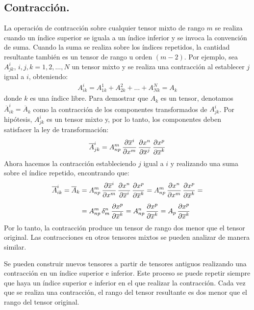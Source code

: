 \documentclass[hidelinks,12pt]{article}
\begin{document}
\subsection{Contracción.}

La operación de contracción sobre cualquier tensor mixto de rango $m$ se realiza cuando un índice superior se iguala a un índice inferior y se invoca la convención de suma. Cuando la suma se realiza sobre los índices repetidos, la cantidad resultante también es un tensor de rango u orden $(m - 2)$. Por ejemplo, sea $A_{jk}^{i}, \, i, j, k = 1, 2, \ldots, N$ un tensor mixto y se realiza una contracción al establecer $j$ igual a $i$, obteniendo:
\begin{align}
A_{ik}^{i} = A_{1k}^{1} + A_{2k}^{2} + \ldots + A_{Nk}^{N} = A_{k}
\label{eq:ecuacion_01_02_57}
\end{align}
donde $k$ es una índice libre. Para demostrar que $A_{k}$ es un tensor, denotamos $\overline{A}_{ik}^{i} = \overline{A}_{k}$ como la contracción de los componentes transformados de $A_{jk}^{i}$. Por hipótesis, $A_{jk}^{i}$ es un tensor mixto y, por lo tanto, los componentes deben satisfacer la ley de transformación:
\begin{align*}
\overline{A}_{jk}^{i} = A_{np}^{m} \, \pdv{\overline{x}^{i}}{x^{m}} \, \pdv{x^{n}}{\overline{x}^{j}} \, \pdv{x^{p}}{\overline{x}^{k}}
\end{align*}
Ahora hacemos la contracción estableciendo $j$ igual a $i$ y realizando una suma sobre el índice repetido, encontrando que:
\begin{align}
\begin{aligned}
\overline{A}_{ik}^{i} = \overline{A}_{k} &= A_{np}^{m} \, \pdv{\overline{x}^{i}}{x^{m}} \, \pdv{x^{n}}{\overline{x}^{i}} \, \pdv{x^{p}}{\overline{x}^{k}} = A_{np}^{m} \, \pdv{x^{n}}{x^{m}} \, \pdv{x^{p}}{\overline{x}^{k}} = \\[0.5em]
&= A_{np}^{m} \, \delta_{m}^{n} \, \pdv{x^{p}}{\overline{x}^{k}} = A_{np}^{n} \, \pdv{x^{p}}{\overline{x}^{k}} = A_{p} \, \pdv{x^{p}}{\overline{x}^{k}}
\end{aligned}
\label{eq:ecuacion_01_02_58}
\end{align}
Por lo tanto, la contracción produce un tensor de rango dos menor que el tensor original. Las contracciones en otros tensores mixtos se pueden analizar de manera similar.
\par
Se pueden construir nuevos tensores a partir de tensores antiguos realizando una contracción en un índice superior e inferior. Este proceso se puede repetir siempre que haya un índice superior e inferior en el que realizar la contracción. Cada vez que se realiza una contracción, el rango del tensor resultante es dos menor que el rango del tensor original.
\end{document}
